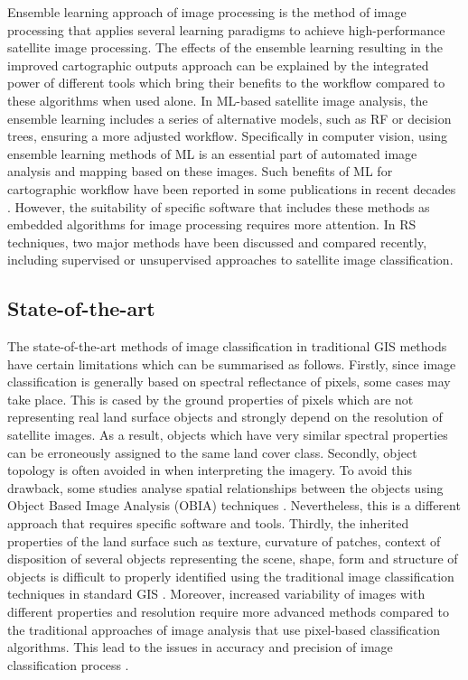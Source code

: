 \documentclass[climate,article,submit,pdftex,moreauthors]{Definitions/mdpi}
\begin{document}
Ensemble learning approach of image processing is the method of image processing that applies several learning paradigms to achieve high-performance satellite image processing. The effects of the ensemble learning resulting in the improved cartographic outputs approach can be explained by the integrated power of different tools which bring their benefits to the workflow compared to these algorithms when used alone. In ML-based satellite image analysis, the ensemble learning includes a series of alternative models, such as RF or decision trees, ensuring a more adjusted workflow. Specifically in computer vision, using ensemble learning methods of ML is an essential part of automated image analysis and mapping based on these images. Such benefits of ML for cartographic workflow have been reported in some publications in recent decades \cite{YOO2019155,SINGH2021100624,MULIK2023106697}. However, the suitability of specific software that includes these methods as embedded algorithms for image processing requires more attention. In RS techniques, two major methods have been discussed and compared recently, including supervised \cite{GOLDBLATT2018253,MARTINEZMONTOYA2010978,INZANA200359} or unsupervised \cite{SHIH199497,LU2023116898,Lemenkova202322} approaches to satellite image classification.

\subsection{State-of-the-art}

The state-of-the-art methods of image classification in traditional GIS methods have certain limitations which can be summarised as follows. Firstly, since image classification is generally based on spectral reflectance of pixels, some cases may take place. This is cased by the ground properties of pixels which are not representing real land surface objects and strongly depend on the resolution of satellite images. As a result, objects which have very similar spectral properties can be erroneously assigned to the same land cover class. Secondly, object topology is often avoided in when interpreting the imagery. To avoid this drawback, some studies analyse spatial relationships between the objects using Object Based Image Analysis (OBIA) techniques \cite{LUCIANO2019127,PHIRI2018170,DEWALI20233109,MAO202011}. Nevertheless, this is a different approach that requires specific software and tools. Thirdly, the inherited properties of the land surface such as texture, curvature of patches, context of disposition of several objects representing the scene, shape, form and structure of objects is difficult to properly identified using the traditional image classification techniques in standard GIS \cite{OUSMANOU2024100239,ZHANG2023129590,BAKR2010592}. Moreover, increased variability of images with different properties and resolution require more advanced methods compared to the traditional approaches of image analysis that use pixel-based classification algorithms. This lead to the issues in accuracy and precision of image classification process \cite{Fisher,McKee}.
\end{document}
